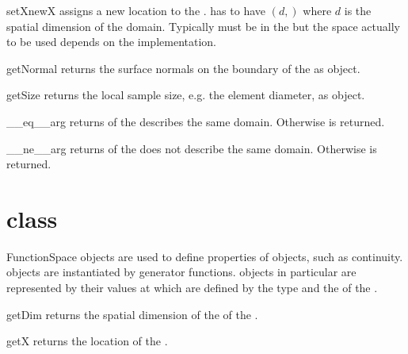 \begin{methoddesc}[Domain]{setX}{newX}
assigns a new location to the \Domain.  has to have \Shape $(d,)$
where $d$ is the spatial dimension of the domain. Typically  must be
in the \ContinuousFunction but the space actually to be used depends on the \Domain implementation.
\end{methoddesc}

\begin{methoddesc}[Domain]{getNormal}{}
returns the surface normals on the boundary of the \Domain as \Data object.
\end{methoddesc}

\begin{methoddesc}[Domain]{getSize}{}
returns the local sample size, e.g. the element diameter, as \Data object.
\end{methoddesc}

\begin{methoddesc}[Domain]{__eq__}{arg}
returns \True of the \Domain {} describes the same domain. Otherwise
\False is returned.
\end{methoddesc}

\begin{methoddesc}[Domain]{__ne__}{arg}
returns \True of the \Domain {} does not describe the same domain. 
Otherwise \False is returned.
\end{methoddesc}

\section{\Domain class}
\begin{classdesc}{FunctionSpace}{}
\FunctionSpace objects are used to define properties of \Data objects, such as continuity. \FunctionSpace objects
are instantiated by generator functions. \Data objects in particular \FunctionSpace are
represented by their values at \DataSamplePoints which are defined by the type and the \Domain of the
\FunctionSpace.
\end{classdesc}

\begin{methoddesc}[FunctionSpace]{getDim}{}
returns the spatial dimension of the \Domain of the \FunctionSpace.
\end{methoddesc}

\begin{methoddesc}[FunctionSpace]{getX}{}
returns the location of the \DataSamplePoints.
\end{methoddesc}

